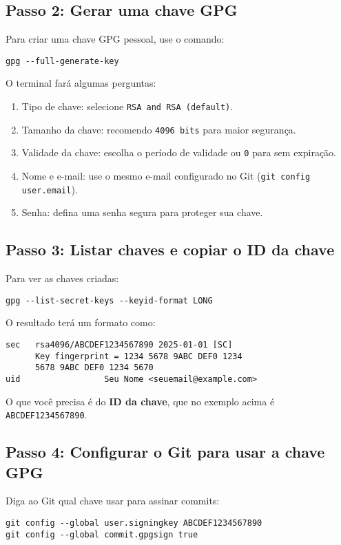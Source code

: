 \subsection{Passo 2: Gerar uma chave GPG}
Para criar uma chave GPG pessoal, use o comando:

\begin{verbatim}
gpg --full-generate-key
\end{verbatim}

O terminal fará algumas perguntas:
\begin{enumerate}
    \item Tipo de chave: selecione \texttt{RSA and RSA (default)}.
    \item Tamanho da chave: recomendo \texttt{4096 bits} para maior segurança.
    \item Validade da chave: escolha o período de validade ou \texttt{0} para sem expiração.
    \item Nome e e-mail: use o mesmo e-mail configurado no Git (\texttt{git config user.email}).
    \item Senha: defina uma senha segura para proteger sua chave.
\end{enumerate}

\subsection{Passo 3: Listar chaves e copiar o ID da chave}
Para ver as chaves criadas:

\begin{verbatim}
gpg --list-secret-keys --keyid-format LONG
\end{verbatim}

O resultado terá um formato como:
\begin{verbatim}
sec   rsa4096/ABCDEF1234567890 2025-01-01 [SC]
      Key fingerprint = 1234 5678 9ABC DEF0 1234
      5678 9ABC DEF0 1234 5670
uid                 Seu Nome <seuemail@example.com>
\end{verbatim}

O que você precisa é do \textbf{ID da chave}, que no exemplo acima é \texttt{ABCDEF1234567890}.

\subsection{Passo 4: Configurar o Git para usar a chave GPG}
Diga ao Git qual chave usar para assinar commits:

\begin{verbatim}
git config --global user.signingkey ABCDEF1234567890
git config --global commit.gpgsign true
\end{verbatim}

